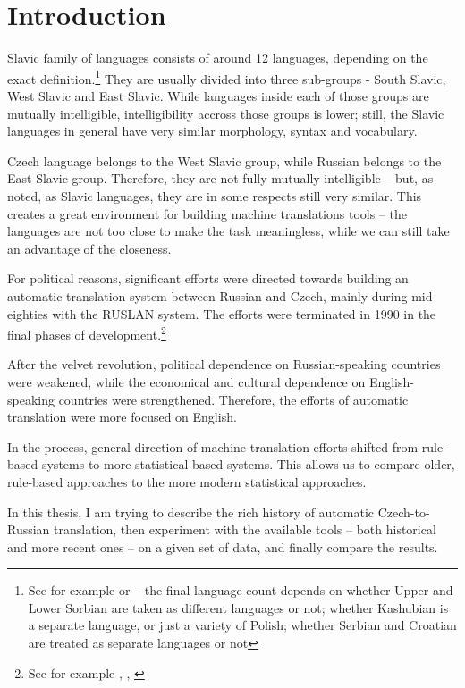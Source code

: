\chapter*{Introduction}
Slavic  family of languages consists of around 12 languages, de\-pen\-ding on the exact definition.\footnote{See for example \cite{sussex2011slavic} or \cite{siewierska1998overview} --  the final language count depends on whether Upper and Lower Sorbian are taken as different languages or not; whether Kashubian is a separate language, or just a variety of Polish; whether Serbian and Croatian are treated as separate languages or not}
They are usually divided into three sub-groups - South Slavic, West Slavic and East Slavic. While languages inside each of those groups are mutually intelligible, intelligibility accross those groups is lower; still, the Slavic languages in general have very similar morphology, syntax and vocabulary.

Czech language belongs to the West Slavic group, while Russian belongs to the East Slavic group.  Therefore, they are not fully mutually intelligible -- but, as noted, as Slavic languages, they are in some respects still very similar. 
This creates a great environment for building machine translations tools -- the languages are not too close to make the task meaningless, while we can still take an advantage of the closeness.

For political reasons, significant efforts were directed towards building an automatic translation system between Russian and Czech, mainly during mid-eighties with the RUSLAN system. The efforts were terminated in 1990 in the final phases of development.\footnote{See for example \cite{recycled}, \cite{hajic1987}, \cite{olivaruslan}} 

After the velvet revolution, political dependence on Russian-speaking countries were weakened, while the economical and cultural dependence on English-speaking countries were strengthened. Therefore, the efforts of automatic translation were more focused on English. 

In the process, general direction of machine translation efforts shifted from rule-based systems to more statistical-based systems. This allows us to compare older, rule-based approaches to the more modern statistical approaches.

In this thesis, I am trying to describe the rich history of automatic Czech-to-Russian translation, then experiment with the available tools -- both historical and more recent ones -- on a given set of data, and finally compare the results.
